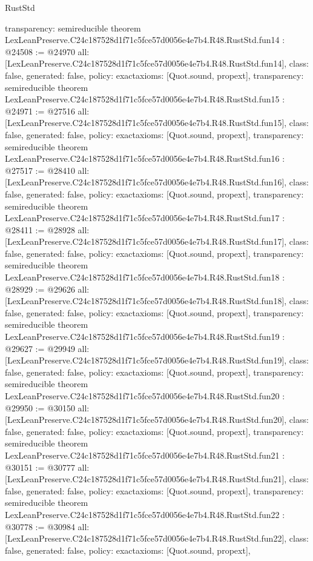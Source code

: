 \begin{lexlean}{RustStd}
\begin{coremodule}
{  transparency: semireducible
}
theorem LexLeanPreserve.C24c187528d1f71c5fce57d0056e4e7b4.R48.RustStd.fun14 : @24508 := @24970 {
  all: [LexLeanPreserve.C24c187528d1f71c5fce57d0056e4e7b4.R48.RustStd.fun14],
  class: false,
  generated: false,
  policy: exact{axioms: [Quot.sound, propext]},
  transparency: semireducible
}
theorem LexLeanPreserve.C24c187528d1f71c5fce57d0056e4e7b4.R48.RustStd.fun15 : @24971 := @27516 {
  all: [LexLeanPreserve.C24c187528d1f71c5fce57d0056e4e7b4.R48.RustStd.fun15],
  class: false,
  generated: false,
  policy: exact{axioms: [Quot.sound, propext]},
  transparency: semireducible
}
theorem LexLeanPreserve.C24c187528d1f71c5fce57d0056e4e7b4.R48.RustStd.fun16 : @27517 := @28410 {
  all: [LexLeanPreserve.C24c187528d1f71c5fce57d0056e4e7b4.R48.RustStd.fun16],
  class: false,
  generated: false,
  policy: exact{axioms: [Quot.sound, propext]},
  transparency: semireducible
}
theorem LexLeanPreserve.C24c187528d1f71c5fce57d0056e4e7b4.R48.RustStd.fun17 : @28411 := @28928 {
  all: [LexLeanPreserve.C24c187528d1f71c5fce57d0056e4e7b4.R48.RustStd.fun17],
  class: false,
  generated: false,
  policy: exact{axioms: [Quot.sound, propext]},
  transparency: semireducible
}
theorem LexLeanPreserve.C24c187528d1f71c5fce57d0056e4e7b4.R48.RustStd.fun18 : @28929 := @29626 {
  all: [LexLeanPreserve.C24c187528d1f71c5fce57d0056e4e7b4.R48.RustStd.fun18],
  class: false,
  generated: false,
  policy: exact{axioms: [Quot.sound, propext]},
  transparency: semireducible
}
theorem LexLeanPreserve.C24c187528d1f71c5fce57d0056e4e7b4.R48.RustStd.fun19 : @29627 := @29949 {
  all: [LexLeanPreserve.C24c187528d1f71c5fce57d0056e4e7b4.R48.RustStd.fun19],
  class: false,
  generated: false,
  policy: exact{axioms: [Quot.sound, propext]},
  transparency: semireducible
}
theorem LexLeanPreserve.C24c187528d1f71c5fce57d0056e4e7b4.R48.RustStd.fun20 : @29950 := @30150 {
  all: [LexLeanPreserve.C24c187528d1f71c5fce57d0056e4e7b4.R48.RustStd.fun20],
  class: false,
  generated: false,
  policy: exact{axioms: [Quot.sound, propext]},
  transparency: semireducible
}
theorem LexLeanPreserve.C24c187528d1f71c5fce57d0056e4e7b4.R48.RustStd.fun21 : @30151 := @30777 {
  all: [LexLeanPreserve.C24c187528d1f71c5fce57d0056e4e7b4.R48.RustStd.fun21],
  class: false,
  generated: false,
  policy: exact{axioms: [Quot.sound, propext]},
  transparency: semireducible
}
theorem LexLeanPreserve.C24c187528d1f71c5fce57d0056e4e7b4.R48.RustStd.fun22 : @30778 := @30984 {
  all: [LexLeanPreserve.C24c187528d1f71c5fce57d0056e4e7b4.R48.RustStd.fun22],
  class: false,
  generated: false,
  policy: exact{axioms: [Quot.sound, propext]},
}
\end{coremodule}
\end{lexlean}
